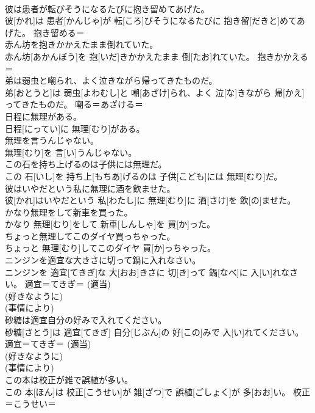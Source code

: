 \documentclass[8pt]{extreport}
\begin{document}
\begin{CJK}{UTF8}{min}
\\	彼は患者が転びそうになるたびに抱き留めてあげた。	
\\	彼[かれ]は 患者[かんじゃ]が 転[ころ]びそうになるたびに 抱き留[だきと]めてあげた。	抱き留める＝ 
\\	赤ん坊を抱きかかえたまま倒れていた。	
\\	赤ん坊[あかんぼう]を 抱[いだ]きかかえたまま 倒[たお]れていた。	抱きかかえる＝ 
\\	弟は弱虫と嘲られ、よく泣きながら帰ってきたものだ。	
\\	弟[おとうと]は 弱虫[よわむし]と 嘲[あざけ]られ、よく 泣[な]きながら 帰[かえ]ってきたものだ。	嘲る＝あざける＝ 
\\	日程に無理がある。	
\\	日程[にってい]に 無理[むり]がある。	
\\	無理を言うんじゃない。	
\\	無理[むり]を 言[い]うんじゃない。	
\\	この石を持ち上げるのは子供には無理だ。	
\\	この 石[いし]を 持ち上[もちあ]げるのは 子供[こども]には 無理[むり]だ。	
\\	彼はいやだという私に無理に酒を飲ませた。	
\\	彼[かれ]はいやだという 私[わたし]に 無理[むり]に 酒[さけ]を 飲[の]ませた。	
\\	かなり無理をして新車を買った。	
\\	かなり 無理[むり]をして 新車[しんしゃ]を 買[か]った。	
\\	ちょっと無理してこのダイヤ買っちゃった。	
\\	ちょっと 無理[むり]してこのダイヤ 買[か]っちゃった。	
\\	ニンジンを適宜な大きさに切って鍋に入れなさい。	
\\	ニンジンを 適宜[てきぎ]な 大[おお]きさに 切[き]って 鍋[なべ]に 入[い]れなさい。	適宜＝てきぎ＝ (適当)
\\	(好きなように) 
\\	(事情により) 
\\	砂糖は適宜自分の好みで入れてください。	
\\	砂糖[さとう]は 適宜[てきぎ] 自分[じぶん]の 好[この]みで 入[い]れてください。	適宜＝てきぎ＝ (適当)
\\	(好きなように) 
\\	(事情により) 
\\	この本は校正が雑で誤植が多い。	
\\	この 本[ほん]は 校正[こうせい]が 雑[ざつ]で 誤植[ごしょく]が 多[おお]い。	校正＝こうせい＝ 

\end{CJK}
\end{document}
